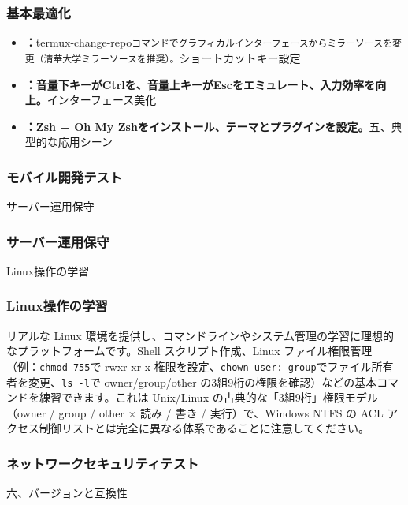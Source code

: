 \subsubsection*{基本最適化}

\begin{itemize}
  \item \textbf{：}termux-change-repo\texttt{コマンドでグラフィカルインターフェースからミラーソースを変更（清華大学ミラーソースを推奨）。}ショートカットキー設定
  \item \textbf{：音量下キーがCtrlを、音量上キーがEscをエミュレート、入力効率を向上。}インターフェース美化
  \item \textbf{：Zsh + Oh My Zshをインストール、テーマとプラグインを設定。}五、典型的な応用シーン
\end{itemize}


\subsubsection*{モバイル開発テスト}

サーバー運用保守

\subsubsection*{サーバー運用保守}

Linux操作の学習

\subsubsection*{Linux操作の学習}

リアルな Linux 環境を提供し、コマンドラインやシステム管理の学習に理想的なプラットフォームです。Shell スクリプト作成、Linux ファイル権限管理（例：\texttt{chmod 755}で rwxr-xr-x 権限を設定、\texttt{chown user: group}でファイル所有者を変更、\texttt{ls -\allowbreak l}で owner/group/other の3組9桁の権限を確認）などの基本コマンドを練習できます。これは Unix/Linux の古典的な「3組9桁」権限モデル（owner / group / other × 読み / 書き / 実行）で、Windows NTFS の ACL アクセス制御リストとは完全に異なる体系であることに注意してください。

\subsubsection*{ネットワークセキュリティテスト}

六、バージョンと互換性

